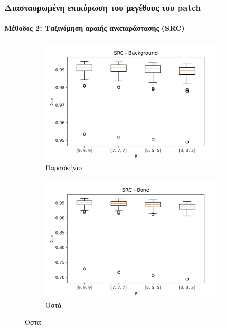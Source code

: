 \documentclass{beamer}
\begin{document}
\begin{frame}
\frametitle{Διασταυρωμένη επικύρωση του μεγέθους του patch}
\framesubtitle{Μέθοδος 2: Ταξινόμηση αραιής αναπαράστασης (SRC)}

\begin{figure}[H]
    \centering

    \begin{subfigure}[b]{0.42\linewidth}
    \includegraphics[width=\linewidth]{SRC_P_Background_plot.png}
    \caption{Παρασκήνιο}
    \end{subfigure}
    \begin{subfigure}[b]{0.42\linewidth}
    \includegraphics[width=\linewidth]{SRC_P_Bone_plot.png}
    \caption{Οστά}
    \end{subfigure}


\end{figure}
\end{frame}
\end{document}
